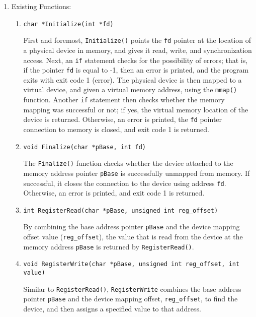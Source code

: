 \begin{enumerate}

  \item Existing Functions:

    \begin{enumerate}

      \item \texttt{char *Initialize(int *fd)}

        First and foremost, \texttt{Initialize()} points the \texttt{fd} pointer at the location of a physical device in memory, and gives it read, write, and synchronization access. Next, an \texttt{if} statement checks for the possibility of errors; that is, if the pointer \texttt{fd} is equal to -1, then an error is printed, and the program exits with exit code 1 (error). The physical device is then mapped to a virtual device, and given a virtual memory address, using the \texttt{mmap()} function. Another \texttt{if} statement then checks whether the memory mapping was successful or not; if yes, the virtual memory location of the device is returned. Otherwise, an error is printed, the \texttt{fd} pointer connection to memory is closed, and exit code 1 is returned.

      \item \texttt{void Finalize(char *pBase, int fd)}

        The \texttt{Finalize()} function checks whether the device attached to the memory address pointer \texttt{pBase} is successfully unmapped from memory. If successful, it closes the connection to the device using address \texttt{fd}. Otherwise, an error is printed, and exit code 1 is returned.

      \item \texttt{int RegisterRead(char *pBase, unsigned int reg\_offset)}

        By combining the base address pointer \texttt{pBase} and the device mapping offset value (\texttt{reg\_offset}), the value that is read from the device at the memory address \texttt{pBase} is returned by \texttt{RegisterRead()}.

      \item \texttt{void RegisterWrite(char *pBase, unsigned int reg\_offset, int value)}

        Similar to \texttt{RegisterRead()}, \texttt{RegisterWrite} combines the base address pointer \texttt{pBase} and the device mapping offset, \texttt{reg\_offset}, to find the device, and then assigns a specified value to that address.


\end{enumerate}
\end{enumerate}
